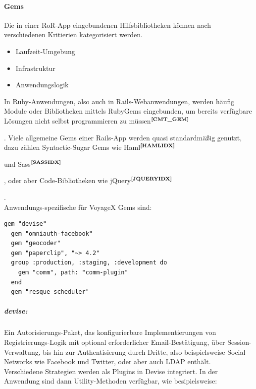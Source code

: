 \paragraph{Gems}\noindent
Die in einer RoR-App eingebundenen Hilfsbibliotheken können nach verschiedenen Kritierien kategorisiert werden.
	\begin{itemize}
		\item Laufzeit-Umgebung
		\item Infrastruktur
		\item Anwendungslogik
	\end{itemize}
In Ruby-Anwendungen, also auch in Rails-Webanwendungen, werden häufig Module oder Bibliotheken mittels RubyGems eingebunden, um bereits verfügbare Lösungen nicht selbst programmieren zu müssen$^{\textbf{\ref{CMT_GEM}}}$%
\addtocounter{footnote}{1}%
. Viele allgemeine Gems einer Rails-App werden quasi standardmäßig genutzt, dazu zählen Syntactic-Sugar Gems wie Haml$^{\textbf{\ref{HAMLIDX}}}$%
\addtocounter{footnote}{1}%
und Sass$^{\textbf{\ref{SASSIDX}}}$%
\addtocounter{footnote}{1}%
, oder aber Code-Bibliotheken wie jQuery$^{\textbf{\ref{JQUERYIDX}}}$%
\addtocounter{footnote}{1}%
.\\
Anwendungs-spezifische für VoyageX Gems sind:\\
\lstset{language=CoffeeScript}
\begin{lstlisting}[frame=single,xleftmargin=0pt,numbers=none]
  gem "devise"
  gem "omniauth-facebook"
  gem "geocoder"
  gem "paperclip", "~> 4.2"
  group :production, :staging, :development do
    gem "comm", path: "comm-plugin"
  end
  gem "resque-scheduler" 
\end{lstlisting}
\subparagraph{devise:}Ein Autorisierungs-Paket, das konfigurierbare Implementierungen von Registrierungs-Logik mit optional erforderlicher Email-Bestätigung, über Session-Verwaltung, bis hin zur Authentisierung durch Dritte, also beispielsweise Social Networks wie Facebook und Twitter, oder aber auch LDAP enthält.\\
Verschiedene Strategien werden als Plugins in Devise integriert. In der Anwendung sind dann Utility-Methoden
verfügbar, wie besipielsweise:
